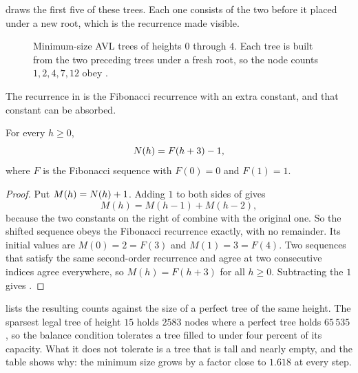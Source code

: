  draws the first five of these trees. Each one consists of the
two before it placed under a new root, which is the recurrence made visible.

\begin{figure}[t]
  \centering
  
  \caption{Minimum-size AVL trees of heights $0$ through $4$. Each tree is built
  from the two preceding trees under a fresh root, so the node counts $1, 2, 4,
  7, 12$ obey .}
  \label{fig:mintrees}
\end{figure}

The recurrence in  is the Fibonacci recurrence with an extra
constant, and that constant can be absorbed.

\begin{theorem}
\label{thm:closedform}
For every $h \ge 0$,
\begin{equation}
  \label{eq:closedform}
  N(h) = F(h+3) - 1 ,
\end{equation}
where $F$ is the Fibonacci sequence with $F(0) = 0$ and $F(1) = 1$.
\end{theorem}

\begin{proof}
Put $M(h) = N(h) + 1$. Adding $1$ to both sides of  gives
\begin{equation}
  \label{eq:mrec}
  M(h) = M(h-1) + M(h-2) ,
\end{equation}
because the two constants on the right of  combine with the
original one. So the shifted sequence obeys the Fibonacci recurrence exactly,
with no remainder. Its initial values are $M(0) = 2 = F(3)$ and $M(1) = 3 =
F(4)$. Two sequences that satisfy the same second-order recurrence and agree at
two consecutive indices agree everywhere, so $M(h) = F(h+3)$ for all $h \ge 0$.
Subtracting the $1$ gives .
\end{proof}

 lists the resulting counts against the size of a perfect tree of
the same height. The sparsest legal tree of height $15$ holds $2583$ nodes where
a perfect tree holds $65\,535$, so the balance condition tolerates a tree filled
to under four percent of its capacity. What it does not tolerate is a tree that
is tall and nearly empty, and the table shows why: the minimum size grows by a
factor close to $1.618$ at every step.

